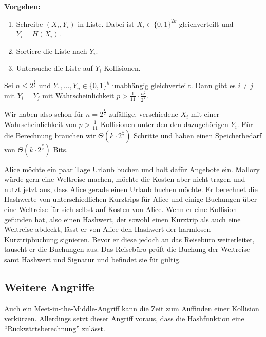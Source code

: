 \textbf{Vorgehen:}
\begin{enumerate}
  \item Schreibe $(X_i, Y_i)$ in Liste. Dabei ist $X_i \in \{0,1\}^{2k}$ gleichverteilt und $Y_i = H(X_i)$.
  \item Sortiere die Liste nach $Y_i$.
  \item Untersuche die Liste auf $Y_i$-Kollisionen.
\end{enumerate}
\vspace{10pt}

\begin{theorem}
Sei $n \leq 2^{\frac{k}{2}}$ und $Y_1, \ldots , Y_n \in \{0,1\}^k$ unabhängig gleichverteilt. Dann gibt es $i \not = j$ mit $Y_i = Y_j$ mit Wahrscheinlichkeit
$p > \frac{1}{11} \cdot \frac{n^2}{2^k}$.
\end{theorem}
\vspace{10pt}

Wir haben also schon für $n = 2^{\frac{k}{2}}$ zufällige, verschiedene $X_i$ mit einer Wahrscheinlichkeit von $p > \frac{1}{11}$ Kollisionen unter den
den dazugehörigen $Y_i$. Für die Berechnung brauchen wir $\Theta(k \cdot 2^{\frac{k}{2}})$ Schritte und haben einen Speicherbedarf von $\Theta(k \cdot
2^{\frac{k}{2}})$ Bits.
\vspace{10pt}

\begin{beispiel}
Alice möchte ein paar Tage Urlaub buchen und holt dafür Angebote ein. Mallory würde gern eine Weltreise machen, möchte die Kosten aber nicht tragen und nutzt
jetzt aus, dass Alice gerade einen Urlaub buchen möchte. Er berechnet die Hashwerte von unterschiedlichen Kurztrips für Alice und einige Buchungen über
eine Weltreise für sich selbst auf Kosten von Alice. Wenn er eine Kollision gefunden hat, also einen Hashwert, der sowohl einen Kurztrip als auch eine
Weltreise abdeckt, lässt er von Alice den Hashwert der harmlosen Kurztripbuchung signieren. Bevor er diese jedoch an das Reisebüro weiterleitet, tauscht er die
Buchungen aus. Das Reisebüro prüft die Buchung der Weltreise samt Hashwert und Signatur und befindet sie für gültig.
\end{beispiel}

\subsection{Weitere Angriffe}
Auch ein Meet-in-the-Middle-Angriff kann die Zeit zum Auffinden einer Kollision verkürzen. Allerdings setzt dieser Angriff voraus, dass die
Hashfunktion eine "`Rückwärtsberechnung"' zulässt.
\vspace{10pt}

